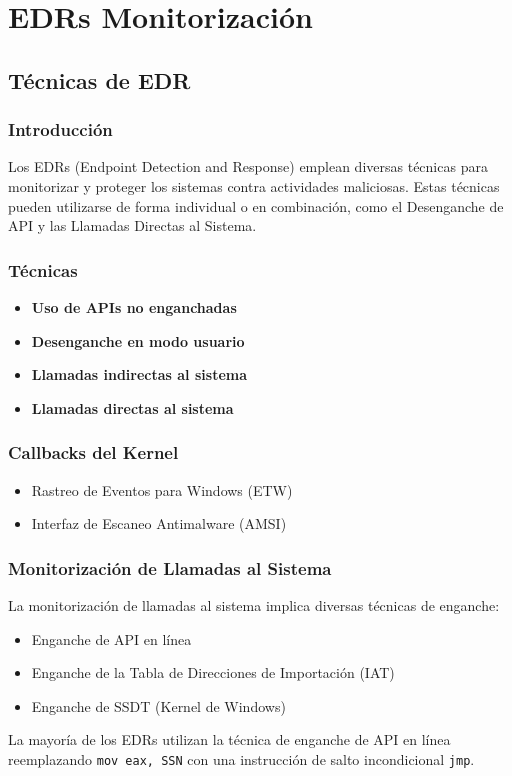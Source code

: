 \chapter{EDRs Monitorización}

\section*{Técnicas de EDR}

\subsection*{Introducción}
Los EDRs (Endpoint Detection and Response) emplean diversas técnicas para
monitorizar y proteger los sistemas contra actividades maliciosas. Estas
técnicas pueden utilizarse de forma individual o en combinación, como el
Desenganche de API y las Llamadas Directas al Sistema.

\subsection*{Técnicas}
\begin{itemize}
    \item \textbf{Uso de APIs no enganchadas}
    \item \textbf{Desenganche en modo usuario}
    \item \textbf{Llamadas indirectas al sistema}
    \item \textbf{Llamadas directas al sistema}
\end{itemize}

\subsection*{Callbacks del Kernel}
\begin{itemize}
    \item Rastreo de Eventos para Windows (ETW)
    \item Interfaz de Escaneo Antimalware (AMSI)
\end{itemize}

\subsection*{Monitorización de Llamadas al Sistema}
La monitorización de llamadas al sistema implica diversas técnicas de enganche:
\begin{itemize}
    \item Enganche de API en línea
    \item Enganche de la Tabla de Direcciones de Importación (IAT)
    \item Enganche de SSDT (Kernel de Windows)
\end{itemize}

La mayoría de los EDRs utilizan la técnica de enganche de API en línea
reemplazando \texttt{mov eax, SSN} con una instrucción de salto incondicional
\texttt{jmp}.
